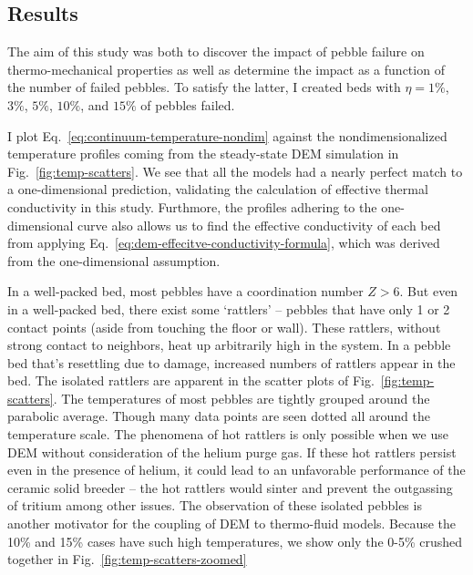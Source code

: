 \subsection{Results}
The aim of this study was both to discover the impact of pebble failure on thermo-mechanical properties as well as determine the impact as a function of the number of failed pebbles. To satisfy the latter, I created beds with $\eta = 1\%$, $3\%$, $5\%$, $10\%$, and $15\%$ of pebbles failed. 

I plot Eq.~\ref{eq:continuum-temperature-nondim} against the nondimensionalized temperature profiles coming from the steady-state DEM simulation in Fig.~\ref{fig:temp-scatters}. We see that all the models had a nearly perfect match to a one-dimensional prediction, validating the calculation of effective thermal conductivity in this study. Furthmore, the profiles adhering to the one-dimensional curve also allows us to find the effective conductivity of each bed from applying Eq.~\ref{eq:dem-effecitve-conductivity-formula}, which was derived from the one-dimensional assumption.

In a well-packed bed, most pebbles have a coordination number $Z > 6$. But even in a well-packed bed, there exist some `rattlers' -- pebbles that have only 1 or 2 contact points (aside from touching the floor or wall). These rattlers, without strong contact to neighbors, heat up arbitrarily high in the system. In a pebble bed that's resettling due to damage, increased numbers of rattlers appear in the bed. The isolated rattlers are apparent in the scatter plots of Fig.~\ref{fig:temp-scatters}. The temperatures of most pebbles are tightly grouped around the parabolic average. Though many data points are seen dotted all around the temperature scale. The phenomena of hot rattlers is only possible when we use DEM without consideration of the helium purge gas. If these hot rattlers persist even in the presence of helium, it could lead to an unfavorable performance of the ceramic solid breeder -- the hot rattlers would sinter and prevent the outgassing of tritium among other issues. The observation of these isolated pebbles is another motivator for the coupling of DEM to thermo-fluid models. Because the 10\% and 15\% cases have such high temperatures, we show only the 0-5\% crushed together in Fig.~\ref{fig:temp-scatters-zoomed}

